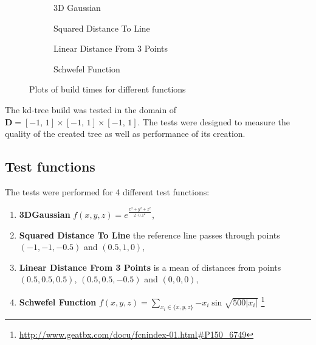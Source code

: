 \begin{figure}
    \centering
    \begin{subfigure}[b]{0.5\textwidth}
        \resizebox{1.0\textwidth}{!}{}
        \caption{3D Gaussian}
        \label{fig:build_time_0}
    \end{subfigure}\hfill
    \begin{subfigure}[b]{0.5\textwidth}
        \resizebox{1.0\textwidth}{!}{}
        \caption{Squared Distance To Line}
        \label{fig:build_time_1}
    \end{subfigure}
    \begin{subfigure}[b]{0.5\textwidth}
        \resizebox{1.0\textwidth}{!}{}
        \caption{Linear Distance From 3 Points}
        \label{fig:build_time_2}
    \end{subfigure}\hfill
    \begin{subfigure}[b]{0.5\textwidth}
        \resizebox{1.0\textwidth}{!}{}
        \caption{Schwefel Function}
        \label{fig:build_time_3}
    \end{subfigure}
    \caption{Plots of build times for different functions}
    \label{fig:build_time}
\end{figure}

The kd-tree build was tested in the domain of $\mathbf{D} = [-1,\,1] \times [-1,\,1] \times [-1,\,1]$.
The tests were designed to measure the quality of the created tree as well as performance of its creation.

\subsection{Test functions}

The tests were performed for 4 different test functions:
\begin{enumerate}
    \item \textbf{3DGaussian} $f(x,y,z) = e^{\frac{x^2+y^2+z^2}{2 \cdot 0.1^2}}$,
    \item \textbf{Squared Distance To Line} the reference
        line passes through points $(-1,-1,-0.5)$ and $(0.5, 1, 0)$,
    \item \textbf{Linear Distance From 3 Points} is a mean of distances from points
        $(0.5, 0.5, 0.5)$, $(0.5, 0.5, -0.5)$ and $(0,0,0)$,
    \item \textbf{Schwefel Function} $f(x,y,z) = \sum\limits_{x_i \in \{ x, y, z \} } { - x_i \sin{\sqrt{500 |x_i|}}}$ 
        \footnote{\url{http://www.geatbx.com/docu/fcnindex-01.html\#P150_6749}}
\end{enumerate}

